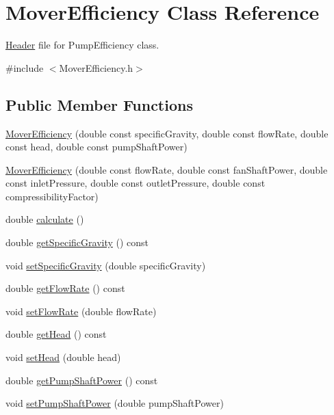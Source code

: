 \hypertarget{class_mover_efficiency}{}\section{Mover\+Efficiency Class Reference}
\label{class_mover_efficiency}


\hyperlink{class_header}{Header} file for Pump\+Efficiency class.  




{\ttfamily \#include $<$Mover\+Efficiency.\+h$>$}

\subsection*{Public Member Functions}
\begin{DoxyCompactItemize}
\item 
\hyperlink{class_mover_efficiency_a582aada664da565f184c319d9304596f}{Mover\+Efficiency} (double const specific\+Gravity, double const flow\+Rate, double const head, double const pump\+Shaft\+Power)
\item 
\hyperlink{class_mover_efficiency_a275951aede53c027e5d25589d401caa5}{Mover\+Efficiency} (double const flow\+Rate, double const fan\+Shaft\+Power, double const inlet\+Pressure, double const outlet\+Pressure, double const compressibility\+Factor)
\item 
double \hyperlink{class_mover_efficiency_ae7b997f1e2fcff1d4263e9921c1a8d9b}{calculate} ()
\item 
double \hyperlink{class_mover_efficiency_a4acdd89fec01daef4902238202e00884}{get\+Specific\+Gravity} () const
\item 
void \hyperlink{class_mover_efficiency_aed095f525636345bdfebe76774afa2d4}{set\+Specific\+Gravity} (double specific\+Gravity)
\item 
double \hyperlink{class_mover_efficiency_a3b0d468a68703127624ab996f03d2368}{get\+Flow\+Rate} () const
\item 
void \hyperlink{class_mover_efficiency_a35bf328fcd7e8334d552bce8b8704379}{set\+Flow\+Rate} (double flow\+Rate)
\item 
double \hyperlink{class_mover_efficiency_a9ce5f2dba38ae4f271bdb2c018667144}{get\+Head} () const
\item 
void \hyperlink{class_mover_efficiency_a1dce269494ecdfc348c8d0a3f9d33df6}{set\+Head} (double head)
\item 
double \hyperlink{class_mover_efficiency_a367c3cb3a070cef9de5e3ca87bbf62fe}{get\+Pump\+Shaft\+Power} () const
\item 
void \hyperlink{class_mover_efficiency_afc2fea6487106318d441a0130ed2934d}{set\+Pump\+Shaft\+Power} (double pump\+Shaft\+Power)
\end{DoxyCompactItemize}


